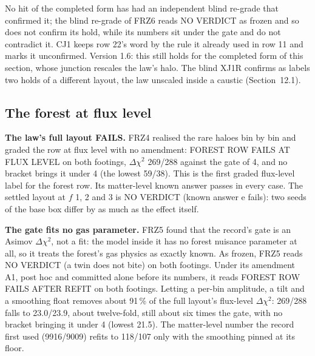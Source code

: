 \documentclass[10pt]{article}
\begin{document}
No hit of the completed form has had an independent blind re-grade that confirmed it; the blind re-grade of FRZ6 reads NO VERDICT as frozen and so does not confirm its hold, while its numbers sit under the gate and do not contradict it. CJ1 keeps row 22's word by the rule it already used in row 11 and marks it unconfirmed. Version 1.6: this still holds for the completed form of this section, whose junction rescales the law's halo. The blind XJ1R confirms as labels two holds of a different layout, the law unscaled inside a caustic (Section~12.1).

\subsection{The forest at flux level}
\textbf{The law's full layout FAILS.} FRZ4 realised the rare haloes bin by bin and graded the row at flux level with no amendment: FOREST ROW FAILS AT FLUX LEVEL on both footings, $\Delta\chi^2$ 269/288 against the gate of 4, and no bracket brings it under 4 (the lowest 59/38). This is the first graded flux-level label for the forest row. Its matter-level known answer passes in every case. The settled layout at $f$ 1, 2 and 3 is NO VERDICT (known answer e fails): two seeds of the base box differ by as much as the effect itself.

\textbf{The gate fits no gas parameter.} FRZ5 found that the record's gate is an Asimov $\Delta\chi^2$, not a fit: the model inside it has no forest nuisance parameter at all, so it treats the forest's gas physics as exactly known. As frozen, FRZ5 reads NO VERDICT (a twin does not bite) on both footings. Under its amendment A1, post hoc and committed alone before its numbers, it reads FOREST ROW FAILS AFTER REFIT on both footings. Letting a per-bin amplitude, a tilt and a smoothing float removes about 91\,\% of the full layout's flux-level $\Delta\chi^2$: 269/288 falls to 23.0/23.9, about twelve-fold, still about six times the gate, with no bracket bringing it under 4 (lowest 21.5). The matter-level number the record first used (9916/9009) refits to 118/107 only with the smoothing pinned at its floor.
\end{document}
